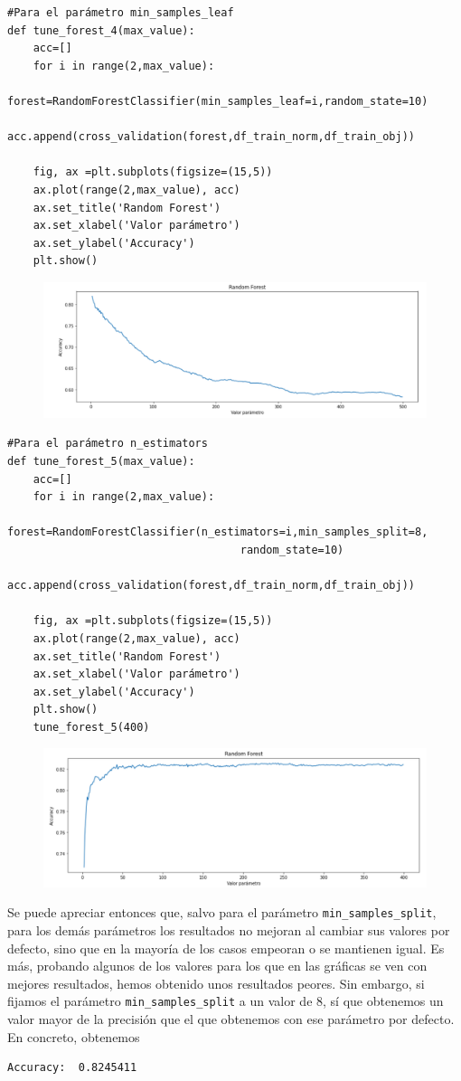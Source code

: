 \documentclass[a4paper,11pt]{article}
\begin{document}
\begin{verbatim}
#Para el parámetro min_samples_leaf
def tune_forest_4(max_value):
	acc=[]
	for i in range(2,max_value):
		forest=RandomForestClassifier(min_samples_leaf=i,random_state=10)
		acc.append(cross_validation(forest,df_train_norm,df_train_obj))
	
	fig, ax =plt.subplots(figsize=(15,5))
	ax.plot(range(2,max_value), acc)
	ax.set_title('Random Forest')
	ax.set_xlabel('Valor parámetro')
	ax.set_ylabel('Accuracy')
	plt.show()
\end{verbatim}
\begin{figure}[H]
	\centering
	\includegraphics[width=0.7\linewidth]{img/forest4}
	\caption{}
	\label{fig:forest4}
\end{figure}

\begin{verbatim}
#Para el parámetro n_estimators
def tune_forest_5(max_value):
	acc=[]
	for i in range(2,max_value):
		forest=RandomForestClassifier(n_estimators=i,min_samples_split=8,
									random_state=10)
		acc.append(cross_validation(forest,df_train_norm,df_train_obj))
	
	fig, ax =plt.subplots(figsize=(15,5))
	ax.plot(range(2,max_value), acc)
	ax.set_title('Random Forest')
	ax.set_xlabel('Valor parámetro')
	ax.set_ylabel('Accuracy')
	plt.show()
	tune_forest_5(400)
\end{verbatim}
\begin{figure}[H]
	\centering
	\includegraphics[width=0.7\linewidth]{img/forst5}
	\caption{}
	\label{fig:forst5}
\end{figure}

Se puede apreciar entonces que, salvo para el parámetro \texttt{min_samples_split}, para los demás parámetros los resultados no mejoran al cambiar sus valores por defecto, sino que en la mayoría de los casos empeoran o se mantienen igual. Es más, probando algunos de los valores para los que en las gráficas se ven con mejores resultados, hemos obtenido unos resultados peores. Sin embargo, si fijamos el parámetro \texttt{min_samples_split} a un valor de 8, sí que obtenemos un valor mayor de la precisión que el que obtenemos con ese parámetro por defecto. En concreto, obtenemos 
\begin{verbatim}
Accuracy:  0.8245411
\end{verbatim}
\end{document}
